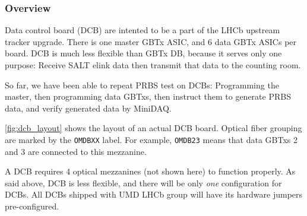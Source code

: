 \subsubsection{Overview}
Data control board (DCB) are intented to be a part of the LHCb upstream tracker
upgrade.
There is one master GBTx ASIC, and 6 data GBTx ASICs per board.
DCB is much less flexible than GBTx DB, because it serves only one purpose:
Receive SALT elink data then transmit that data to the counting room.

So far, we have been able to repeat PRBS test on DCBs:
Programming the master, then programming data GBTxs, then instruct them to
generate PRBS data, and verify generated data by MiniDAQ.

\autoref{fig:dcb_layout} shows the layout of an actual DCB board.
Optical fiber grouping are marked by the \texttt{OMDBXX} label. For example,
\texttt{OMDB23} means that data GBTxs 2 and 3 are connected to this mezzanine.

A DCB requires 4 optical mezzanines (not shown here) to function properly.
As said above, DCB is less flexible, and there will be only \emph{one}
configuration for DCBs.
All DCBs shipped with UMD LHCb group will have its hardware jumpers
pre-configured.


